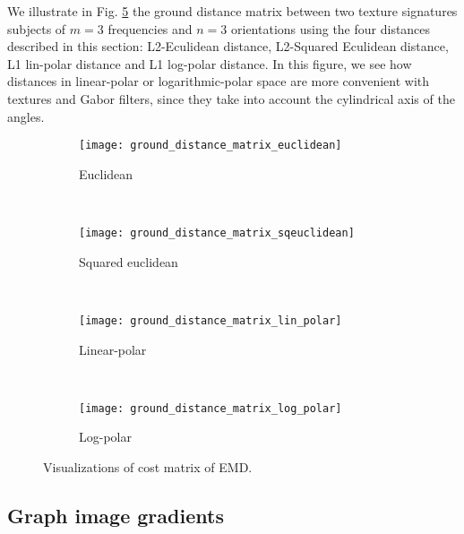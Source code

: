 We illustrate in Fig. \ref{fig:EMD_ground_distance_matrix} the ground distance matrix between two texture signatures subjects of $m = 3$ frequencies and $n = 3$ orientations using the four distances described in this section: L2-Eculidean distance, L2-Squared Eculidean distance, L1 lin-polar distance and L1 log-polar distance. In this figure, we see how distances in linear-polar or logarithmic-polar space are more convenient with textures and Gabor filters, since they take into account the cylindrical axis of the angles.

\begin{figure}[!ht]
    \centering
    \begin{subfigure}[b]{0.47\textwidth}
		\texttt{[image: ground\_distance\_matrix\_euclidean]}	
		\caption{Euclidean}
        \label{fig:ground_distance_matrix_euclidean}
	\end{subfigure}
	~ %
    \begin{subfigure}[b]{0.47\textwidth}
		\texttt{[image: ground\_distance\_matrix\_sqeuclidean]}	
		\caption{Squared euclidean}
        \label{fig:ground_distance_matrix_sqeuclidean}
	\end{subfigure} \\[2ex]
    
    \begin{subfigure}[b]{0.47\textwidth}
		\texttt{[image: ground\_distance\_matrix\_lin\_polar]}	
		\caption{Linear-polar}
        \label{fig:ground_distance_matrix_lin_polarc}
	\end{subfigure}  
	~ %
	\begin{subfigure}[b]{0.47\textwidth}
		\texttt{[image: ground\_distance\_matrix\_log\_polar]}	
		\caption{Log-polar}
        \label{fig:ground_distance_matrix_log_polar}
	\end{subfigure}  
	   
   \caption{Visualizations of cost matrix of EMD.}
   \label{fig:EMD_ground_distance_matrix}
\end{figure}

\subsection{Graph image gradients}

